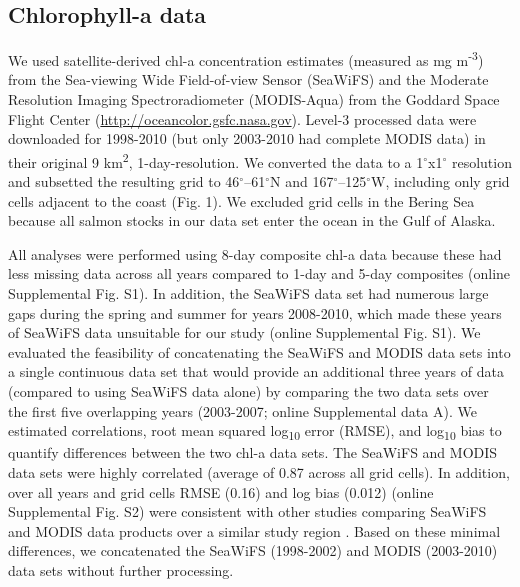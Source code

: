 \subsection{Chlorophyll-a data}

We used satellite-derived chl-a concentration estimates (measured as mg
m\textsuperscript{-3}) from the Sea-viewing Wide Field-of-view Sensor (SeaWiFS)
and the Moderate Resolution Imaging Spectroradiometer (MODIS-Aqua) from the
Goddard Space Flight Center (\url{http://oceancolor.gsfc.nasa.gov}). Level-3
processed data were downloaded for 1998-2010 (but only 2003-2010 had complete
MODIS data) in their original 9 km\textsuperscript{2}, 1-day-resolution. We
converted the data to a 1$^{\circ}$x1$^{\circ}$ resolution and subsetted the
resulting grid to 46$^{\circ}$--61$^{\circ}$N and 167$^{\circ}$--125$^{\circ}$W,
including only grid cells adjacent to the coast (Fig.  1). We excluded grid
cells in the Bering Sea because all salmon stocks in our data set enter the
ocean in the Gulf of Alaska.

All analyses were performed using 8-day composite chl-a data because these had
less missing data across all years compared to 1-day and 5-day composites
(online Supplemental Fig. S1). In addition, the SeaWiFS data set had numerous
large gaps during the spring and summer for years 2008-2010, which made these
years of SeaWiFS data unsuitable for our study (online Supplemental Fig. S1). We
evaluated the feasibility of concatenating the SeaWiFS and MODIS data sets into
a single continuous data set that would provide an additional three years of
data (compared to using SeaWiFS data alone) by comparing the two data sets over
the first five overlapping years (2003-2007; online Supplemental data A). We
estimated correlations, root mean squared log\textsubscript{10} error (RMSE),
and log\textsubscript{10} bias to quantify differences between the two chl-a
data sets. The SeaWiFS and MODIS data sets were highly correlated (average of
0.87 across all grid cells). In addition, over all years and grid cells RMSE
(0.16) and log bias (0.012) (online Supplemental Fig. S2) were consistent with
other studies comparing SeaWiFS and MODIS data products over a similar study
region \citep{Waite2013}. Based on these minimal differences, we concatenated
the SeaWiFS (1998-2002) and MODIS (2003-2010) data sets without further
processing.


